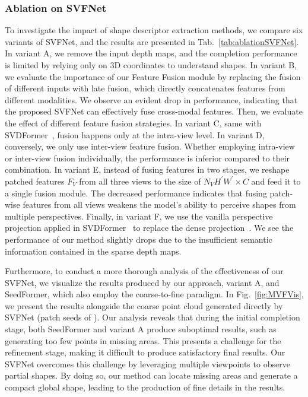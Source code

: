 \subsubsection{Ablation on SVFNet}
To investigate the impact of shape descriptor extraction methods, we compare six variants of SVFNet, and the results are presented in Tab.~\ref{tab:ablationSVFNet}. 
In variant A, we remove the input depth maps, and the completion performance is limited by relying only on 3D coordinates to understand shapes. 
In variant B, we evaluate the importance of our Feature Fusion module by replacing the fusion of different inputs with late fusion, which directly concatenates features from different modalities. We observe an evident drop in performance, indicating that the proposed SVFNet can effectively fuse cross-modal features. 
Then, we evaluate the effect of different feature fusion strategies. In variant C, same with SVDFormer~\citep{Zhu_2023_ICCV}, fusion happens only at the intra-view level. In variant D, conversely, we only use inter-view feature fusion. Whether employing intra-view or inter-view fusion individually, the performance is inferior compared to their combination. In variant E, instead of fusing features in two stages, we reshape patched features $F_V$ from all three views to the size of ${N_V H^{\prime} W^{\prime} \times C}$ and feed it to a single fusion module. The decreased performance indicates that fusing patch-wise features from all views weakens the model's ability to perceive shapes from multiple perspectives.
Finally, in variant F, we use the vanilla perspective projection applied in SVDFormer~\citep{Zhu_2023_ICCV} to replace the dense projection~\citep{PointCLIPV2}. We see the performance of our method slightly drops due to the insufficient semantic information contained in the sparse depth maps. 

Furthermore, to conduct a more thorough analysis of the effectiveness of our SVFNet, we visualize the results produced by our approach, variant A, and SeedFormer, which also employ the coarse-to-fine paradigm. In Fig.~\ref{fig:MVFVis}, we present the results alongside the coarse point cloud generated directly by SVFNet (patch seeds of \cite{zhou2022seedformer}). Our analysis reveals that during the initial completion stage, both SeedFormer and variant A produce suboptimal results, such as generating too few points in missing areas. This presents a challenge for the refinement stage, making it difficult to produce satisfactory final results. Our SVFNet overcomes this challenge by leveraging multiple viewpoints to observe partial shapes. By doing so, our method can locate missing areas and generate a compact global shape, leading to the production of fine details in the results. 

